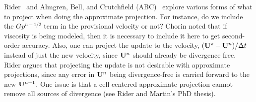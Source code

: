 Rider~\cite{rider} and Almgren, Bell, and Crutchfield (ABC)~\cite{ABC}
explore various forms of what to project when doing the approximate
projection.  For instance, do we include the $Gp^{n-1/2}$ term in the
provisional velocity or not?  Chorin noted that if viscosity is being
modeled, then it is necessary to include it here to get second-order
accuracy.  Also, one can project the update to the velocity, $({\bf U}^\star
- {\bf U}^n)/\Delta t$ instead of just the new velocity, since ${\bf U}^n$ should
already be divergence free.  Rider argues that projecting the update
is not desirable with approximate projections, since any error in
${\bf U}^n$ being divergence-free is carried forward to the new ${\bf U}^{n+1}$.
One issue is that a cell-centered approximate projection cannot remove
all sources of divergence (see Rider and Martin's PhD thesis).

